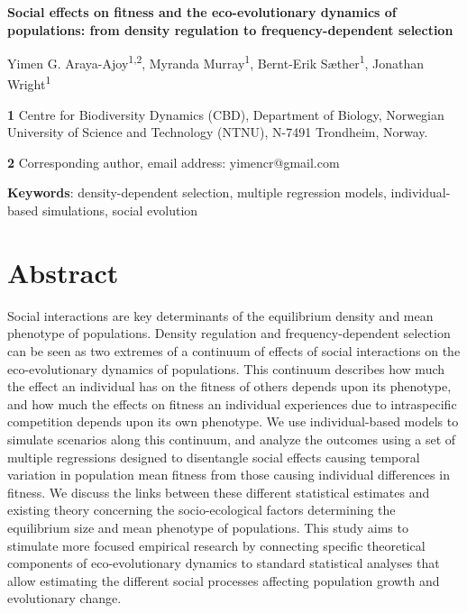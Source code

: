 \documentclass{article}
\begin{document}
\begin{center}
\large
\textbf{Social effects on fitness and the eco-evolutionary dynamics of populations: from density regulation to frequency-dependent selection}
\end{center}

\begin{center}
	Yimen G. Araya-Ajoy\textsuperscript{1,2}, Myranda Murray\textsuperscript{1},  Bernt-Erik Sæther\textsuperscript{1}, Jonathan Wright\textsuperscript{1}
\end{center}

\bigskip
\textbf{1} Centre for Biodiversity Dynamics (CBD), Department of Biology, Norwegian University of Science and Technology (NTNU), N-7491 Trondheim, Norway.

\bigskip
\textbf{2} Corresponding author, email address: yimencr@gmail.com

\bigskip
\textbf{Keywords}: density-dependent selection, multiple regression models, individual-based simulations, social evolution

\newpage
\section{Abstract}
Social interactions are key determinants of the equilibrium density and mean phenotype of populations. Density regulation and frequency-dependent selection can be seen as two extremes of a continuum of effects of social interactions on the eco-evolutionary dynamics of populations. This continuum  describes how much the effect an individual has on the fitness of others depends upon its phenotype, and how much the effects on fitness an individual experiences due to intraspecific competition depends upon its own phenotype. We use individual-based models to simulate scenarios along this continuum, and analyze the outcomes using a set of multiple regressions designed to disentangle social effects causing temporal variation in population mean fitness from those causing individual differences in fitness. We discuss the links between these different statistical estimates and existing theory concerning the socio-ecological factors determining the equilibrium size and mean phenotype of populations. This study aims to stimulate more focused empirical research by connecting specific theoretical components of eco-evolutionary dynamics to standard statistical analyses that allow estimating the different social processes affecting population growth and evolutionary change. 
\end{document}
